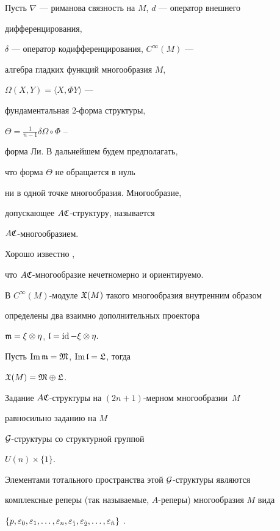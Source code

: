 Пусть $\nabla$ --- риманова связность на $M$, $d$ --- оператор внешнего 


дифференцирования,


$\delta$ --- оператор кодифференцирования, $C^{\infty}(M)$ ---


алгебра гладких функций многообразия $M$,


$\Omega(X,Y)=\langle X,\Phi Y\rangle$ ---


фундаментальная 2-форма структуры,


$\Theta=\frac1{n-1}\delta\Omega\circ\Phi$ --


форма Ли. В дальнейшем будем предполагать,


что форма $\Theta$ не обращается в нуль 


ни в одной точке многообразия. Многообразие,


допускающее $A\frak C$-структуру, называется 


$A\frak C$-многообразием.


Хорошо известно \cite{8},


что $A\frak C$-многообразие нечетномерно и ориентируемо.


В $C^{\infty}(M)$-модуле $\frak X(M)$ такого многообразия внутренним образом 


определены два взаимно дополнительных проектора 


$\frak m=\xi\otimes\eta$, $\frak l=\operatorname{id}-\xi\otimes\eta.$


Пусть $\operatorname{Im} \frak m=\frak M$, $\operatorname{Im}\frak l=\frak L$, тогда 


$\frak X(M)=\frak M \oplus \frak L$.





Задание $A\frak C$-структуры на $(2n+1)$-мерном многообразии~$M$


равносильно заданию на $M$\linebreak


$\cal G$-структуры со структурной группой


$U(n)\times \{1\}$.


Элементами тотального пространства этой $\cal G$-структуры являются 


комплексные реперы (так называемые, $A$-реперы) многообразия $M$ вида 


$\{p,\varepsilon_0,\varepsilon_1,\dotsc,\varepsilon_n,


\varepsilon_{\Hat 1},


\varepsilon_{\Hat 2},\dotsc,\varepsilon_{\Hat n} \}$ \cite{9}.


